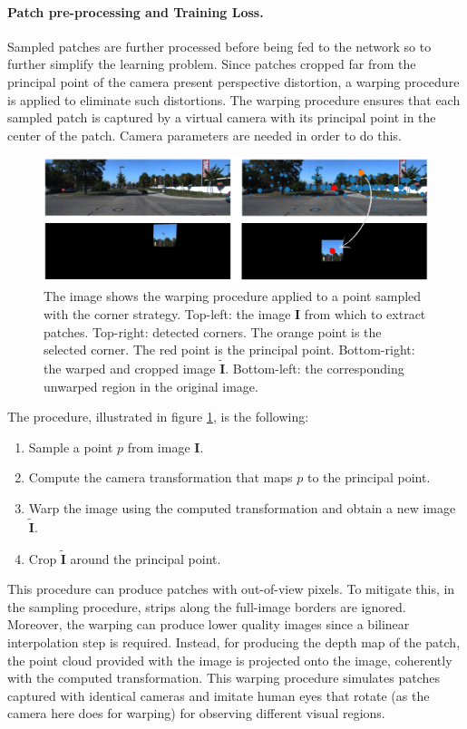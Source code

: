 \paragraph{Patch pre-processing and Training Loss.}
Sampled patches are further processed before being fed to the network so to further simplify the learning problem.
Since patches cropped far from the principal point of the camera present perspective distortion, a warping procedure is applied to eliminate such distortions.
The warping procedure ensures that each sampled patch is captured by a virtual camera with its principal point in the center of the patch.
Camera parameters are needed in order to do this.
\begin{figure}
    \centering
    \includegraphics[width=\textwidth]{figs/warping}
    \caption{
        The image shows the warping procedure applied to a point sampled with the corner strategy.
        Top-left: the image $\mathbf{I}$ from which to extract patches.
        Top-right: detected corners. The orange point is the selected corner. The red point is the principal point.
        Bottom-right: the warped and cropped image $\tilde{\mathbf{I}}$.
        Bottom-left: the corresponding unwarped region in the original image.
        \label{fig:warping}
    }
\end{figure}
The procedure, illustrated in figure \ref{fig:warping}, is the following:
\begin{enumerate}
    \item{Sample a point $p$ from image $\mathbf{I}$.}
    \item{Compute the camera transformation that maps $p$ to the principal point.}
    \item{Warp the image using the computed transformation and obtain a new image $\tilde{\mathbf{I}}$.}
    \item{Crop $\tilde{\mathbf{I}}$ around the principal point.}
\end{enumerate}
This procedure can produce patches with out-of-view pixels.
To mitigate this, in the sampling procedure, strips along the full-image borders are ignored.
Moreover, the warping can produce lower quality images since a bilinear interpolation step is required.
Instead, for producing the depth map of the patch, the point cloud provided with the image is projected onto the image, coherently with the computed transformation.
This warping procedure simulates patches captured with identical cameras and imitate human eyes that rotate (as the camera here does for warping) for observing different visual regions.

